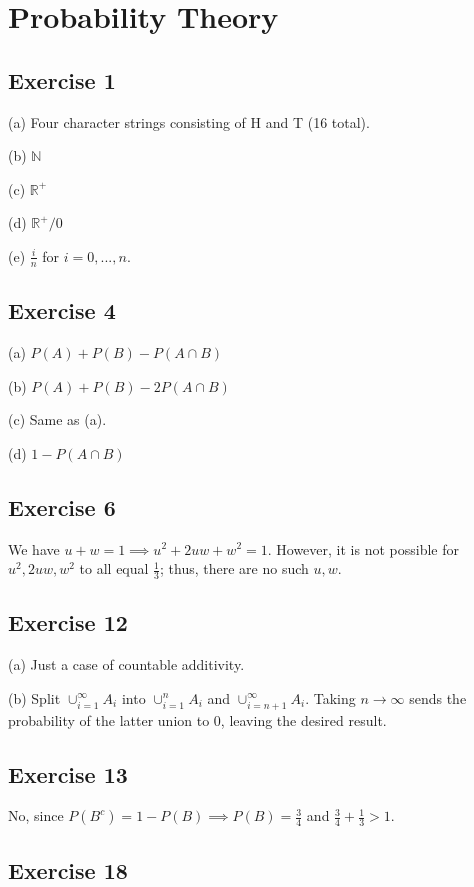 \section{Probability Theory}

\subsection{Exercise 1}
(a) Four character strings consisting of H and T (16 total).

(b) $\mathbb{N}$

(c) $\mathbb{R}^+$

(d) $\mathbb{R}^+ / 0$

(e) $\frac{i}{n}$ for $i = 0, ..., n$.

\subsection{Exercise 4}
(a) $P(A) + P(B) - P(A \cap B)$ 

(b) $P(A) + P(B) - 2P(A \cap B)$ 

(c) Same as (a).

(d) $1 - P(A \cap B)$

\subsection{Exercise 6}
We have $u + w = 1 \implies u^2 + 2uw + w^2 = 1$. However, it is not possible for
$u^2, 2uw, w^2$ to all equal $\frac{1}{3}$; thus, there are no such $u, w$.

\subsection{Exercise 12}
(a) Just a case of countable additivity.

(b) Split $\cup_{i = 1}^{\infty} A_i$ into $\cup_{i = 1}^{n} A_i$ and $\cup_{i = n + 1}^{\infty} A_i$.
Taking $n \to  \infty$ sends the probability of the latter union to 0, leaving the
desired result.

\subsection{Exercise 13}
No, since $P(B^c) = 1 - P(B) \implies P(B) = \frac{3}{4}$ and $\frac{3}{4} + \frac{1}{3} > 1$.

\subsection{Exercise 18}

